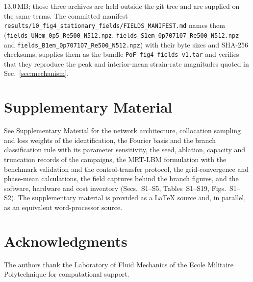 \documentclass[11pt,a4paper]{article}
\newenvironment{chgadd}{\par\color{blue}}{\par\color{black}}
\begin{document}
\begin{chgadd}
$13.0$\,MB; those three archives are held outside the git tree and are supplied on
the same terms. The committed manifest
\texttt{results/10\_fig4}\hspace{0pt}\texttt{\_stationary\_fields/}\hspace{0pt}\texttt{FIELDS}\hspace{0pt}\texttt{\_MANIFEST.md}
names them (\texttt{fields\_UNem\_0p5\_Re500\_N512.npz},
\texttt{fields\_S1em\_0p707107\_Re500\_N512.npz} and
\texttt{fields\_B1em\_0p707107\_Re500\_N512.npz}) with their byte sizes and SHA-256
checksums, supplies them as the bundle
\texttt{PoF\_fig4}\hspace{0pt}\texttt{\_fields\_v1.tar} and verifies that they
reproduce the peak and interior-mean strain-rate magnitudes quoted in
Sec.~\ref{sec:mechanism}.

\section*{Supplementary Material}

See Supplementary Material for the network architecture,
collocation sampling and loss weights of the identification, the Fourier basis and
the branch classification rule with its parameter sensitivity, the seed, ablation,
capacity and truncation records of the campaigns, the MRT-LBM formulation with the
benchmark validation and the control-transfer protocol, the grid-convergence and
phase-mean calculations, the field captures behind the branch figures, and the
software, hardware and cost inventory (Secs.~S1--S5, Tables~S1--S19, Figs.~S1--S2).
The supplementary material is provided as a LaTeX source and, in parallel, as an
equivalent word-processor source.
\end{chgadd}

\section*{Acknowledgments}
The authors thank the Laboratory of Fluid Mechanics of the Ecole Militaire
Polytechnique for computational support.
\end{document}
